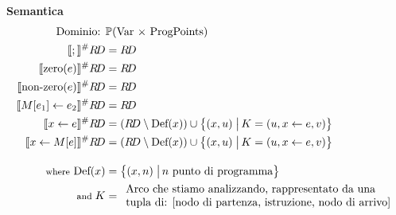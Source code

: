 \documentclass[a4paper,12pt,openany]{article}
\newcommand{\RD}{R\!D}
\begin{document}
    \textbf{Semantica}
    \begin{align*}
        \mbox{Dominio: }& \mathbb{P}(\mbox{Var $\times$ ProgPoints})\\
        \llbracket ; \rrbracket^\#\RD &= \RD\\
        \llbracket \mbox{zero}(e) \rrbracket^\#\RD &= \RD\\
        \llbracket \mbox{non-zero}(e) \rrbracket^\#\RD &= \RD\\
        \llbracket M[e_1]\leftarrow e_2 \rrbracket^\#\RD &= \RD\\
        \llbracket x \leftarrow e \rrbracket^\#\RD &= (\RD\setminus \mbox{Def}(x)) \cup
        \left\{
            (x, u) \;\big\vert\, K = (u, x\leftarrow e, v)
        \right\}\\
        \llbracket x\leftarrow M[e] \rrbracket^\#\RD &= (\RD\setminus \mbox{Def}(x)) \cup
        \left\{
            (x, u) \;\big\vert\, K = (u, x\leftarrow e, v)
        \right\}\\[1em]
        \mbox{{\footnotesize where} Def}(x) &=
        \left\{
            (x, n) \;\big\vert\, n \mbox{ punto di programma}
        \right\}\\
        \mbox{\footnotesize and } K &= 
        \begin{array}{ll}
            \mbox{Arco che stiamo analizzando, rappresentato da una}\\
            \mbox{tupla di: [nodo di partenza, istruzione, nodo di arrivo]}
        \end{array}
    \end{align*}
\end{document}
